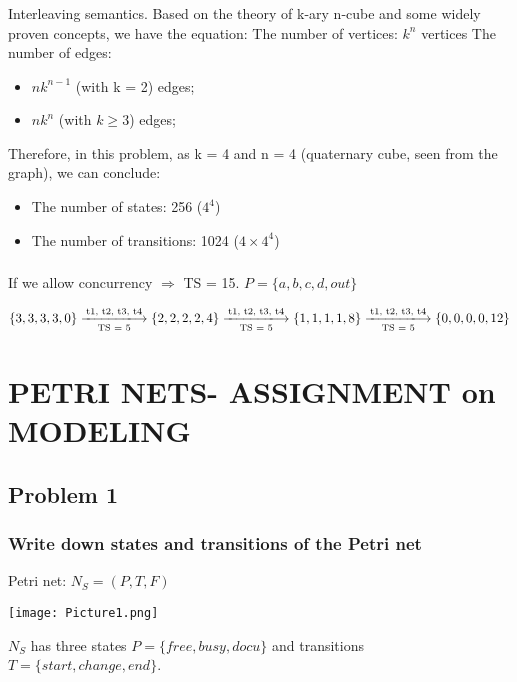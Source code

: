 \documentclass[a4paper]{article}
\begin{document}
\subsubsection{}
Interleaving semantics.\newline
Based on the theory of k-ary n-cube and some widely proven concepts, we have the equation:\newline
The number of vertices: $k^{n}$ vertices\newline
The number of edges:
\begin{itemize}
    \item $nk^{n-1}$ (with k = 2) edges;
    \item $nk^{n}$ (with $k \geq 3$) edges;
\end{itemize}
Therefore, in this problem, as k = 4 and n = 4 (quaternary cube, seen from the graph), we can conclude:
\begin{itemize}
    \item The number of states: 256 ($4^{4}$)
    \item The number of transitions: 1024 ($4 \times 4^{4}$)
\end{itemize}
\subsubsection{}
If we allow concurrency $\Rightarrow$ TS = 15.\newline
$P = \{a,b,c,d,out\}$
\begin{center}
    $\{3, 3, 3, 3, 0\} \xlongrightarrow[\text{TS = 5}]{\text{t1, t2, t3, t4}} \{2, 2, 2, 2, 4\} \xlongrightarrow[\text{TS = 5}]{\text{t1, t2, t3, t4}} \{1, 1, 1, 1, 8\} \xlongrightarrow[\text{TS = 5}]{\text{t1, t2, t3, t4}} \{0, 0, 0, 0, 12\}$
\end{center}

\vspace{1 cm}

\section{PETRI NETS- ASSIGNMENT on MODELING}

\subsection{Problem 1}
\subsubsection{Write down states and transitions of the Petri net}
Petri net: $N_{S} = (P, T, F)$
\begin{center}
    \texttt{[image: Picture1.png]}
\end{center}
$N_{S}$ has three states $P = \{free, busy, docu\}$ and transitions $T = \{start,change,end\}$.
\end{document}
